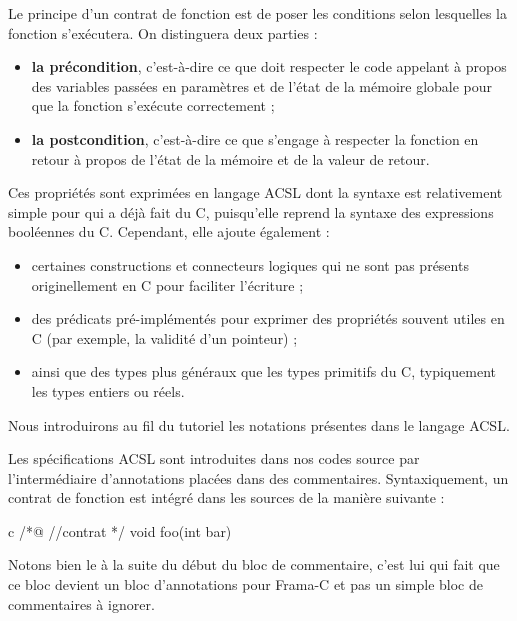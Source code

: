 Le principe d'un contrat de fonction est de poser les conditions selon
lesquelles la fonction s'exécutera. On distinguera deux parties :


\begin{itemize}
\item \textbf{la précondition}, c'est-à-dire ce que doit respecter le code
      appelant à propos des variables passées en paramètres et de l'état de
      la mémoire globale pour que la fonction s'exécute correctement ;
\item \textbf{la postcondition}, c'est-à-dire ce que s'engage à respecter la
      fonction en retour à propos de l'état de la mémoire et de la valeur de
      retour.
\end{itemize}


Ces propriétés sont exprimées en langage ACSL dont la syntaxe est relativement
simple pour qui a déjà fait du C, puisqu'elle reprend la syntaxe des expressions
booléennes du C. Cependant, elle ajoute également :



\begin{itemize}
\item certaines constructions et connecteurs logiques qui ne sont pas présents
originellement en C pour faciliter l'écriture ;
\item des prédicats pré-implémentés pour exprimer des propriétés souvent utiles
en C (par exemple, la validité d'un pointeur) ;
\item ainsi que des types plus généraux que les types primitifs du C,
typiquement les types entiers ou réels.
\end{itemize}


Nous introduirons au fil du tutoriel les notations présentes dans le
langage ACSL.



Les spécifications ACSL sont introduites dans nos codes source par
l'intermédiaire d'annotations placées dans des commentaires. Syntaxiquement,
un contrat de fonction est intégré dans les sources de la manière suivante :



\begin{CodeBlock}{c}
/*@
  //contrat
*/
void foo(int bar){

}
\end{CodeBlock}



Notons bien le  à la suite du début du bloc de commentaire, c'est lui qui
fait que ce bloc devient un bloc d'annotations pour Frama-C et pas un simple
bloc de commentaires à ignorer.



